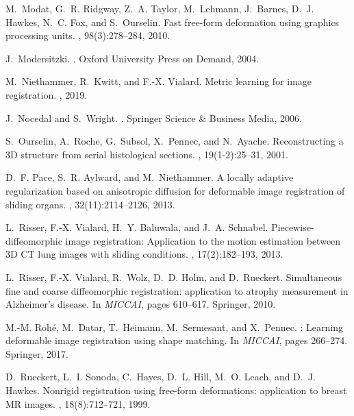 \documentclass{article}
\numberwithin{equation}{section}
\begin{document}
{\begin{thebibliography}{10}
M.~Modat, G.~R. Ridgway, Z.~A. Taylor, M.~Lehmann, J.~Barnes, D.~J. Hawkes,
  N.~C. Fox, and S.~Ourselin.
\newblock Fast free-form deformation using graphics processing units.
, 98(3):278--284,
  2010.

J.~Modersitzki.
.
\newblock Oxford University Press on Demand, 2004.

M.~Niethammer, R.~Kwitt, and F.-X. Vialard.
\newblock Metric learning for image registration.
, 2019.

J.~Nocedal and S.~Wright.
.
\newblock Springer Science \& Business Media, 2006.

S.~Ourselin, A.~Roche, G.~Subsol, X.~Pennec, and N.~Ayache.
\newblock Reconstructing a {3D} structure from serial histological sections.
, 19(1-2):25--31, 2001.

D.~F. Pace, S.~R. Aylward, and M.~Niethammer.
\newblock A locally adaptive regularization based on anisotropic diffusion for
  deformable image registration of sliding organs.
, 32(11):2114--2126, 2013.

L.~Risser, F.-X. Vialard, H.~Y. Baluwala, and J.~A. Schnabel.
\newblock Piecewise-diffeomorphic image registration: Application to the motion
  estimation between {3D CT} lung images with sliding conditions.
, 17(2):182--193, 2013.

L.~Risser, F.-X. Vialard, R.~Wolz, D.~D. Holm, and D.~Rueckert.
\newblock Simultaneous fine and coarse diffeomorphic registration: application
  to atrophy measurement in {Alzheimer’s} disease.
\newblock In {\em MICCAI}, pages 610--617. Springer, 2010.

M.-M. Roh{\'e}, M.~Datar, T.~Heimann, M.~Sermesant, and X.~Pennec.
: Learning deformable image registration using shape
  matching.
\newblock In {\em MICCAI}, pages 266--274. Springer, 2017.

D.~Rueckert, L.~I. Sonoda, C.~Hayes, D.~L. Hill, M.~O. Leach, and D.~J. Hawkes.
\newblock Nonrigid registration using free-form deformations: application to
  breast {MR} images.
, 18(8):712--721, 1999.


\end{thebibliography}}
\end{document}
